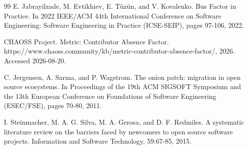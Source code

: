 \documentclass[11pt,letterpaper]{article}
\begin{document}
\begin{thebibliography}{99}
 E. Jabrayilzade, M. Evtikhiev, E. Tüzün, and V. Kovalenko. Bus Factor in Practice. In 2022 IEEE/ACM 44th International Conference on Software Engineering: Software Engineering in Practice (ICSE-SEIP), pages 97-106, 2022.

 CHAOSS Project. Metric: Contributor Absence Factor. https://www.chaoss.community/kb/metric-contributor-absence-factor/, 2026. Accessed 2026-08-20.

 C. Jergensen, A. Sarma, and P. Wagstrom. The onion patch: migration in open source ecosystems. In Proceedings of the 19th ACM SIGSOFT Symposium and the 13th European Conference on Foundations of Software Engineering (ESEC/FSE), pages 70-80, 2011.

 I. Steinmacher, M. A. G. Silva, M. A. Gerosa, and D. F. Redmiles. A systematic literature review on the barriers faced by newcomers to open source software projects. Information and Software Technology, 59:67-85, 2015.

\end{thebibliography}
\end{document}
